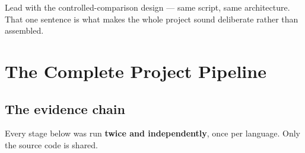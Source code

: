 \documentclass[11pt]{report}
\begin{document}
\begin{keypoint}
Lead with the controlled-comparison design --- same script, same architecture.
That one sentence is what makes the whole project sound deliberate rather than
assembled.
\end{keypoint}

\chapter{The Complete Project Pipeline}

\section{The evidence chain}

Every stage below was run \textbf{twice and independently}, once per language.
Only the source code is shared.
\end{document}
